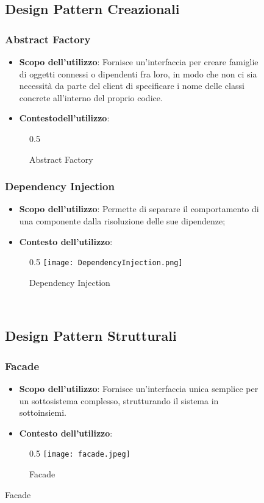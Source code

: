 \begin{figure}
	\subsection{Design Pattern Creazionali}
		
		\subsubsection{Abstract Factory }
		\begin{itemize}\itemsep1pt
			\item \textbf{Scopo dell'utilizzo}: Fornisce un'interfaccia per creare famiglie di oggetti connessi o dipendenti fra loro, in modo che non ci sia necessità da parte del client di specificare i nome delle classi concrete all'interno del proprio codice.
			\item \textbf{Contestodell'utilizzo}:
		\end{itemize}
		\begin{figure}[h]{0.5}
			\centering
			\caption{Abstract Factory}
			\label{fig. Abstract Factory}
		\end{figure}
		
		\subsubsection{Dependency Injection}
		\begin{itemize}\itemsep1pt
			\item\textbf{Scopo dell'utilizzo}: Permette di separare il comportamento di una componente dalla risoluzione delle sue dipendenze;
			\item\textbf{Contesto dell'utilizzo}:
		\end{itemize}
		\begin{figure}[h]{0.5}
			\centering
			\texttt{[image: DependencyInjection.png]}
			\caption{Dependency Injection}
			\label{fig. Dependency Injection}
		\end{figure}
		\\

	\subsection{Design Pattern Strutturali}

		\subsubsection{Facade} 
		 \begin{itemize}
		 		\item\textbf{Scopo dell'utilizzo}: Fornisce un'interfaccia unica semplice per un sottosistema complesso, strutturando il sistema in sottoinsiemi.
		 		\item\textbf{Contesto dell'utilizzo}: 
		 \end{itemize}		 	
		\begin{figure}[h]{0.5}
			\centering
			\texttt{[image: facade.jpeg]}
			\caption{Facade}
			\label{fig. Facade}	
		\end{figure}
		 		

\end{figure}

